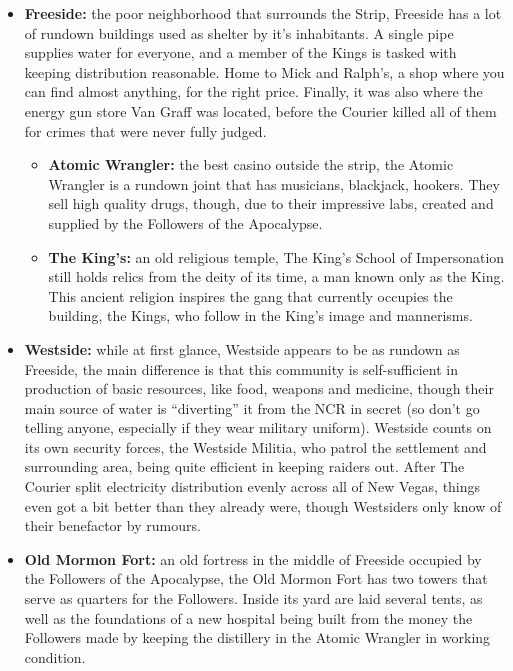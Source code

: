 \documentclass[11pt]{article} %
\begin{document}
\begin{itemize}
\item \textbf{Freeside:} the poor neighborhood that surrounds the Strip, Freeside has a lot of rundown buildings used as shelter by it's inhabitants. A single pipe supplies water for everyone, and a member of the Kings is tasked with keeping distribution reasonable. Home to Mick and Ralph's, a shop where you can find almost anything, for the right price. Finally, it was also where the energy gun store Van Graff was located, before the Courier killed all of them for crimes that were never fully judged.
	\begin{itemize}
	\item \textbf{Atomic Wrangler:} the best casino outside the strip, the Atomic Wrangler is a rundown joint that has musicians, blackjack, hookers. They sell high quality drugs, though, due to their impressive labs, created and supplied by the Followers of the Apocalypse.
	\item \textbf{The King's:} an old religious temple, The King's School of Impersonation still holds relics from the deity of its time, a man known only as the King. This ancient religion inspires the gang that currently occupies the building, the Kings, who follow in the King's image and mannerisms.
	\end{itemize}

\item \textbf{Westside:} while at first glance, Westside appears to be as rundown as Freeside, the main difference is that this community is self-sufficient in production of basic resources, like food, weapons and medicine, though their main source of water is ``diverting'' it from the NCR in secret (so don't go telling anyone, especially if they wear military uniform). Westside counts on its own security forces, the Westside Militia, who patrol the settlement and surrounding area, being quite efficient in keeping raiders out. After The Courier split electricity distribution evenly across all of New Vegas, things even got a bit better than they already were, though Westsiders only know of their benefactor by rumours.

\item \textbf{Old Mormon Fort:} an old fortress in the middle of Freeside occupied by the Followers of the Apocalypse, the Old Mormon Fort has two towers that serve as quarters for the Followers. Inside its yard are laid several tents, as well as the foundations of a new hospital being built from the money the Followers made by keeping the distillery in the Atomic Wrangler in working condition.


\end{itemize}
\end{document}
